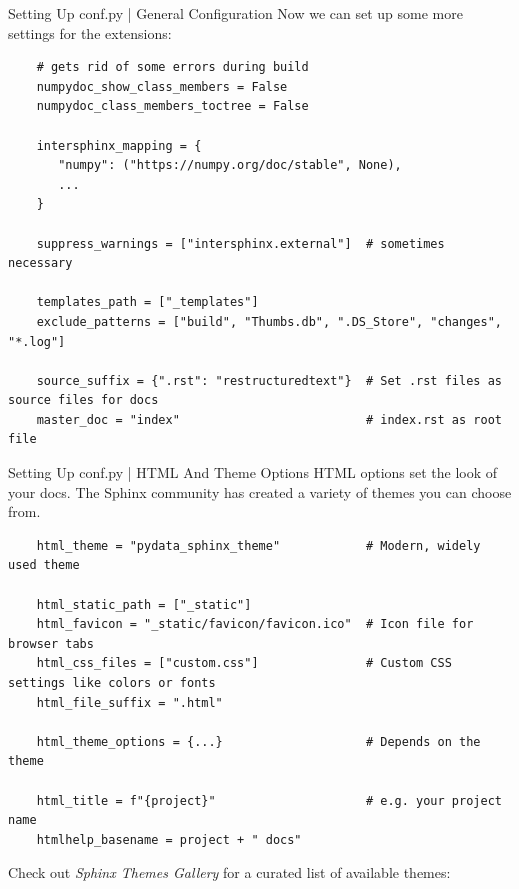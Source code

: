 \begin{darkframe}[fragile]{Setting Up conf.py | General Configuration}
  Now we can set up some more settings for the extensions:\\[0.25\baselineskip]
    \begin{verbatim}
    # gets rid of some errors during build
    numpydoc_show_class_members = False
    numpydoc_class_members_toctree = False

    intersphinx_mapping = {
       "numpy": ("https://numpy.org/doc/stable", None),
       ...
    }

    suppress_warnings = ["intersphinx.external"]  # sometimes necessary

    templates_path = ["_templates"]
    exclude_patterns = ["build", "Thumbs.db", ".DS_Store", "changes", "*.log"]

    source_suffix = {".rst": "restructuredtext"}  # Set .rst files as source files for docs
    master_doc = "index"                          # index.rst as root file
  \end{verbatim}
\end{darkframe}

\begin{darkframe}[fragile]{Setting Up conf.py | HTML And Theme Options}
  HTML options set the look of your docs. The Sphinx community has created a variety of
  themes you can choose from.\\[0.25\baselineskip]
  \begin{verbatim}
    html_theme = "pydata_sphinx_theme"            # Modern, widely used theme

    html_static_path = ["_static"]
    html_favicon = "_static/favicon/favicon.ico"  # Icon file for browser tabs
    html_css_files = ["custom.css"]               # Custom CSS settings like colors or fonts
    html_file_suffix = ".html"

    html_theme_options = {...}                    # Depends on the theme

    html_title = f"{project}"                     # e.g. your project name
    htmlhelp_basename = project + " docs"
  \end{verbatim}
  \vspace{0.25\baselineskip}
  Check out \emph{Sphinx Themes Gallery} for a curated list of available themes:
\end{darkframe}


